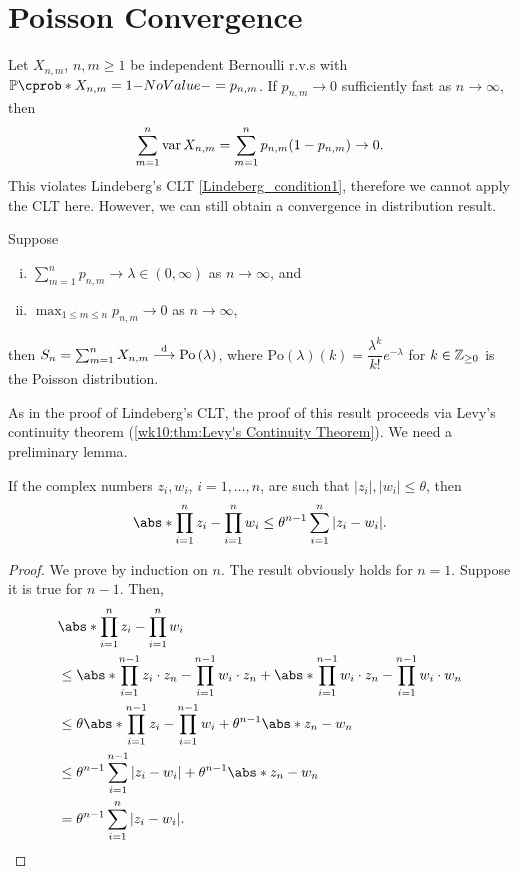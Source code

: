 \documentclass[12pt]{article}
\newcommand{\Po}[1]{\mathrm{Po}\left(#1\right)}
\begin{document}
\section{Poisson Convergence}

Let $X_{n,m}$, $n,m\geq 1$ be independent Bernoulli r.v.s with $\P(X_{n,m}=1)=p_{n,m}$. If $p_{n,m} \to 0$ sufficiently fast as $n\to\infty$, then
\begin{align*}
\sum_{m=1}^n \operatorname{var} X_{n,m} = \sum_{m=1}^n p_{n,m}(1-p_{n,m}) \to 0.
\end{align*}
This violates Lindeberg's CLT \cref{Lindeberg_condition1}, therefore we cannot apply the CLT here. However, we can still obtain a convergence in distribution result.

\begin{Theorem}\label{wk11:thm:Poisson convergence}
Suppose 
\begin{enumerate}[(i)]
	\item $\sum_{m=1}^n p_{n,m} \to \lambda \in (0,\infty)$ as $n\to\infty$, and
	\item $\max_{1\leq m\leq n} p_{n,m} \to 0$ as $n\to\infty$,
\end{enumerate}
then $S_n = \sum_{m=1}^n X_{n,m} \convd \Po{\lambda}$, where $\Po{\lambda}(k)= \dfrac{\lambda^k}{k!} e^{-\lambda}$ for $k\in\mathbb{Z}_{\geq0}$ is the Poisson distribution.
\end{Theorem} 
As in the proof of Lindeberg's CLT, the proof of this result proceeds via Levy's continuity theorem (\cref{wk10:thm:Levy's Continuity Theorem}). We need a preliminary lemma.

\begin{Lemma}\label{wk11:lem:prodbound}
If the complex numbers $z_i, w_i$, $i=1,\ldots,n$, are such that $|z_i|, |w_i| \leq \theta$, then
\begin{align*}
\abs*{\prod_{i=1}^n z_i - \prod_{i=1}^n w_i} \leq \theta^{n-1} \sum_{i=1}^n |z_i-w_i|.
\end{align*}
\end{Lemma}
\begin{proof}
We prove by induction on $n$. The result obviously holds for $n=1$. Suppose it is true for $n-1$. Then,
\begin{align*}
& \abs*{\prod_{i=1}^n z_i - \prod_{i=1}^n w_i} \\
& \leq \abs*{\prod_{i=1}^{n-1} z_i \cdot z_n - \prod_{i=1}^{n-1} w_i \cdot z_n} + \abs*{\prod_{i=1}^{n-1} w_i \cdot z_n - \prod_{i=1}^{n-1} w_i \cdot w_n} \\
& \leq \theta \abs*{\prod_{i=1}^{n-1} z_i - \prod_{i=1}^{n-1} w_i} + \theta^{n-1} \abs*{z_n - w_n} \\
& \leq \theta^{n-1} \sum_{i=1}^{n-1} |z_i-w_i| + \theta^{n-1} \abs*{z_n - w_n} \\
& = \theta^{n-1} \sum_{i=1}^n |z_i-w_i|.
\end{align*}
\end{proof}
\end{document}
